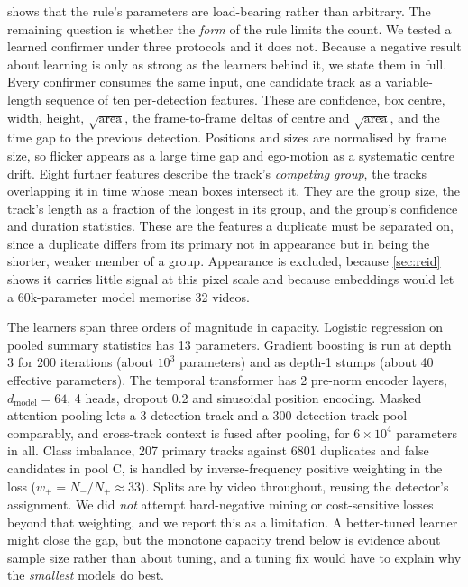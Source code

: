  shows that the rule's parameters are load-bearing rather than
arbitrary. The remaining question is whether the \emph{form} of the rule limits the count.
We tested a learned confirmer under three
protocols and it does not. Because a negative result about learning is only as strong as
the learners behind it, we state them in full. Every confirmer consumes the same input, one candidate track as a variable-length sequence of ten per-detection features. These are confidence, box centre, width, height, $\sqrt{\text{area}}$, the frame-to-frame deltas of
centre and $\sqrt{\text{area}}$, and the time gap to the previous detection. Positions and
sizes are normalised by frame size, so flicker appears as a large time gap and ego-motion
as a systematic centre drift. Eight further features describe the track's \emph{competing
group}, the tracks overlapping it in time whose mean boxes intersect it. They are the group size, the
track's length as a fraction of the longest in its group, and the group's confidence and
duration statistics. These are the features a duplicate must be separated on, since a
duplicate differs from its primary not in appearance but in being the shorter, weaker
member of a group. Appearance is excluded, because \cref{sec:reid} shows it carries little
signal at this pixel scale and because embeddings would let a 60k-parameter model memorise
32 videos.

The learners span three orders of magnitude in capacity. Logistic regression on pooled
summary statistics has 13 parameters. Gradient boosting is run at depth 3 for 200
iterations (about $10^3$ parameters) and as depth-1 stumps (about 40 effective
parameters). The temporal transformer has 2 pre-norm encoder layers, $d_{\text{model}}=64$,
4 heads, dropout 0.2 and sinusoidal position encoding. Masked attention pooling lets a 3-detection track and a 300-detection track pool comparably, and cross-track context is fused after pooling, for $6\times10^4$ parameters in all. Class imbalance, 207 primary tracks
against 6801 duplicates and false candidates in pool C, is handled by inverse-frequency
positive weighting in the loss ($w_+=N_-/N_+\approx33$). Splits are by video throughout,
reusing the detector's assignment. We did \emph{not} attempt hard-negative mining or
cost-sensitive losses beyond that weighting, and we report this as a limitation. A better-tuned learner might close the gap, but the monotone capacity trend
below is evidence about sample size rather than about tuning, and a tuning fix would have
to explain why the \emph{smallest} models do best.

